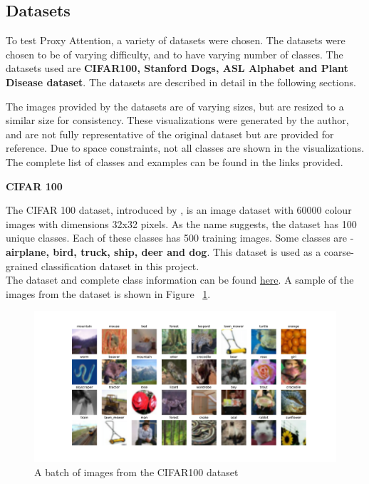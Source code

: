 \documentclass[a4paper,11pt,openright]{book}
\begin{document}
\subsection{Datasets}
To test Proxy Attention, a variety of datasets were chosen. The datasets were chosen to be of varying difficulty, and to have varying number of classes. The datasets used are \textbf{CIFAR100, Stanford Dogs, ASL Alphabet and Plant Disease dataset}. The datasets are described in detail in the following sections.

The images provided by the datasets are of varying sizes, but are resized to a similar size for consistency. These visualizations were generated by the author, and are not fully representative of the original dataset but are provided for reference. Due to space constraints, not all classes are shown in the visualizations. The complete list of classes and examples can be found in the links provided.

\textbf{CIFAR 100}

The CIFAR 100 dataset, introduced by \cite{krizhevskyLearningMultipleLayers}, is an image dataset with 60000 colour images with dimensions 32x32 pixels. As the name suggests, the dataset has 100 unique classes. Each of these classes has 500 training images. Some classes are - \textbf{airplane, bird, truck, ship, deer and dog}. This dataset is used as a coarse-grained classification dataset in this project.\\
The dataset and complete class information can be found \href{https://www.kaggle.com/datasets/fedesoriano/cifar100}{here}.
A sample of the images from the dataset is shown in Figure ~\ref{fig:cifar100}.

\begin{figure}[!htb]
    \centering
    \includegraphics[width=1\textwidth]{images/cifar100.pdf}
    \caption{A batch of images from the CIFAR100 dataset}
    \label{fig:cifar100}
\end{figure}
\end{document}
